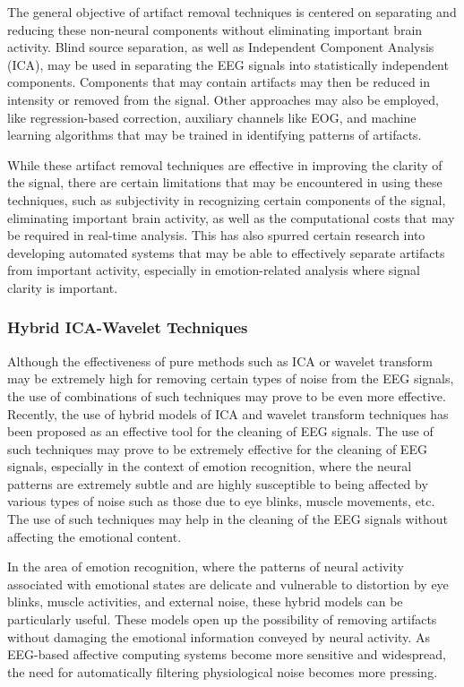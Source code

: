 \documentclass{WileyMSP-template}
\begin{document}
The general objective of artifact removal techniques is centered on separating and reducing these non-neural components without eliminating important brain activity. Blind source separation, as well as Independent Component Analysis (ICA), may be used in separating the EEG signals into statistically independent components. Components that may contain artifacts may then be reduced in intensity or removed from the signal. Other approaches may also be employed, like regression-based correction, auxiliary channels like EOG, and machine learning algorithms that may be trained in identifying patterns of artifacts.

While these artifact removal techniques are effective in improving the clarity of the signal, there are certain limitations that may be encountered in using these techniques, such as subjectivity in recognizing certain components of the signal, eliminating important brain activity, as well as the computational costs that may be required in real-time analysis. This has also spurred certain research into developing automated systems that may be able to effectively separate artifacts from important activity, especially in emotion-related analysis where signal clarity is important.

\subsubsection{Hybrid ICA-Wavelet Techniques}

Although the effectiveness of pure methods such as ICA or wavelet transform may be extremely high for removing certain types of noise from the EEG signals, the use of combinations of such techniques may prove to be even more effective. Recently, the use of hybrid models of ICA and wavelet transform techniques has been proposed as an effective tool for the cleaning of EEG signals. The use of such techniques may prove to be extremely effective for the cleaning of EEG signals, especially in the context of emotion recognition, where the neural patterns are extremely subtle and are highly susceptible to being affected by various types of noise such as those due to eye blinks, muscle movements, etc. The use of such techniques may help in the cleaning of the EEG signals without affecting the emotional content.

In the area of emotion recognition, where the patterns of neural activity associated with emotional states are delicate and vulnerable to distortion by eye blinks, muscle activities, and external noise, these hybrid models can be particularly useful. These models open up the possibility of removing artifacts without damaging the emotional information conveyed by neural activity. As EEG-based affective computing systems become more sensitive and widespread, the need for automatically filtering physiological noise becomes more pressing.
\end{document}
